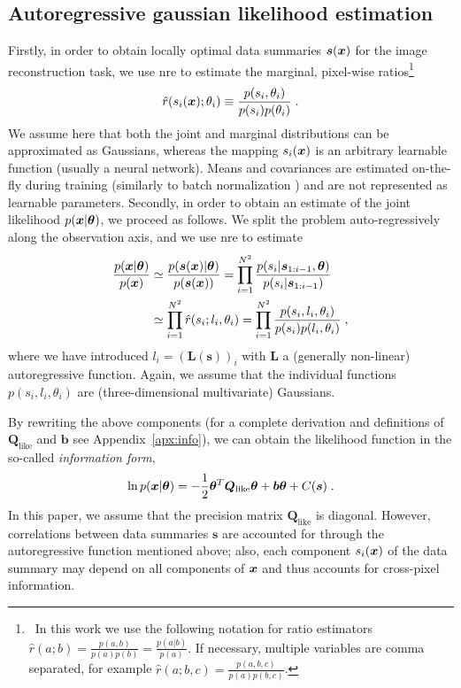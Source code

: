 \subsection{Autoregressive gaussian likelihood estimation} \label{subsec:cosmo-auto}

Firstly, in order to obtain locally optimal data summaries $\bm s(\bm{x})$ for the image reconstruction task, we use \gls*{nre} to estimate the marginal, pixel-wise ratios\footnote{~In this work we use the following notation for ratio estimators $\hat r(a;b) = \frac{p(a,b)}{p(a)p(b)} = \frac{p(a|b)}{p(a)}$. If necessary, multiple variables are comma separated,
for example $\hat r(a; b, c)=\frac{p(a,b,c)}{p(a)p(b, c)}$.}
\begin{equation}
    \hat r(s_i(\bm{x}); \theta_i) \equiv \frac{p(s_i , \theta_i)}{p(s_i)p(\theta_i)} \;.
\end{equation}
We assume here that both the joint and marginal distributions can be approximated as Gaussians, whereas the mapping $s_i(\bm{x})$ is an arbitrary learnable function (usually a neural network). 
Means and covariances are estimated on-the-fly during training (similarly to batch normalization \cite{Ioffe:2015ovl}) and are not represented as learnable parameters.
Secondly, in order to obtain an estimate of the joint likelihood $p(\bm{x}|\bm{\theta})$, we proceed as follows.  We split the problem auto-regressively along the observation axis, and we use \gls*{nre} to estimate
\begin{equation} \label{eq:cosmo-autoregressive}
\begin{split}
        \frac{p(\bm{x}| \bm{\theta})}{p(\bm{x})} &\simeq \frac{p(\bm s(\bm{x})| \bm{\theta})}{p(\bm s(\bm{x}))} = \prod_{i=1}^{N^2} \frac{p(s_i| \bm s_{1:i-1}, \bm{\theta})}{p(s_i| \bm s_{1:i-1})} \\
        &\simeq \prod_{i=1}^{N^2}  \hat r(s_i; l_i, \theta_i) = \prod_{i=1}^{N^2} \frac{p(s_i, l_i, \theta_i)}{p(s_i)p(l_i, \theta_i)} \;,
\end{split}
\end{equation}
where we have introduced $l_i = (\bm L(\bm s))_i$ with $\bm L$ a (generally non-linear) autoregressive function.
Again, we assume that the individual functions $p(s_i, l_i, \theta_i)$ are (three-dimensional multivariate) Gaussians.

By rewriting the above components (for a complete derivation and definitions of $\bm Q_{\text{like}}$ and $\bm b$ see Appendix~\ref{apx:info}), we can obtain the likelihood function in the so-called \emph{information form},
\begin{equation}\label{eq:cosmo-likelihood}
    \ln p(\bm{x}|\bm{\theta}) = -\frac12 \bm{\theta}^T \bm Q_{\text{like}} \bm{\theta} + \bm b \bm{\theta} + C(\bm s) \;.
\end{equation}
In this paper, we assume that the precision matrix $\bm Q_{\text{like}}$ is diagonal. However, correlations between data summaries $\bm s$ are accounted for through the autoregressive function mentioned above; also, each component $s_i(\bm{x})$ of the data summary may depend on all components of $\bm{x}$ and thus accounts for cross-pixel information.


